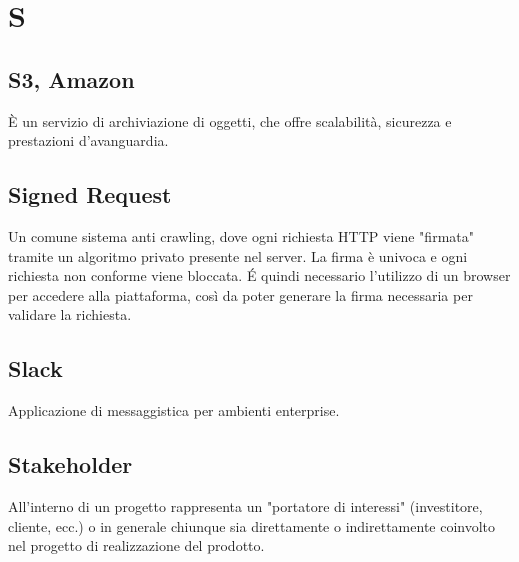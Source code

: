 \section{S}

\subsection{S3, Amazon}
È un servizio di archiviazione di oggetti, che offre scalabilità, sicurezza e prestazioni d'avanguardia. 

\subsection{Signed Request}
Un comune sistema anti crawling, dove ogni richiesta HTTP viene "firmata" tramite un algoritmo privato presente nel server. La firma è univoca e ogni richiesta non conforme viene bloccata. \'E quindi necessario l'utilizzo di un browser per accedere alla piattaforma, così da poter generare la firma necessaria per validare la richiesta.

\subsection{Slack}
Applicazione di messaggistica per ambienti enterprise.

\subsection{Stakeholder}
All’interno di un progetto rappresenta un "portatore di interessi" (investitore, cliente, ecc.) o in generale chiunque sia direttamente o indirettamente coinvolto nel progetto di realizzazione del prodotto.

\clearpage